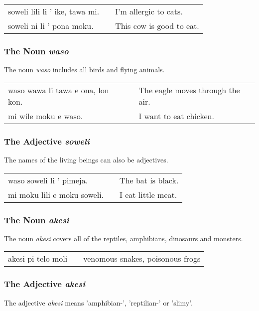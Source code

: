 \begin{supertabular}{p{5,5cm}|ll}
    soweli lili li ' ike, tawa mi. &  & I'm allergic to cats.    \\
    soweli ni li ' pona moku.      &  & This cow is good to eat. \\
\end{supertabular}

\subsubsection*{The Noun \textit{waso}}
The noun \textit{waso} includes all birds and flying animals.

\begin{supertabular}{p{5,5cm}|ll}
    waso wawa li tawa e ona, lon kon. &  & The eagle moves through the air. \\
    mi wile moku e waso.              &  & I want to eat chicken.           \\
\end{supertabular}

\subsubsection*{The Adjective \textit{soweli}}
The names of the living beings can also be adjectives.

\begin{supertabular}{p{5,5cm}|ll}
    waso soweli li ' pimeja.    &  & The bat is black.  \\
    mi moku lili e moku soweli. &  & I eat little meat. \\
\end{supertabular}

\subsubsection*{The Noun \textit{akesi}}
The noun \textit{akesi} covers all of the reptiles, amphibians, dinosaurs and monsters.

\begin{supertabular}{p{5,5cm}|ll}
    akesi pi telo moli &  & venomous snakes, poisonous frogs \\
\end{supertabular}

\subsubsection*{The Adjective \textit{akesi}}
The adjective \textit{akesi} means 'amphibian-', 'reptilian-' or 'slimy'.

